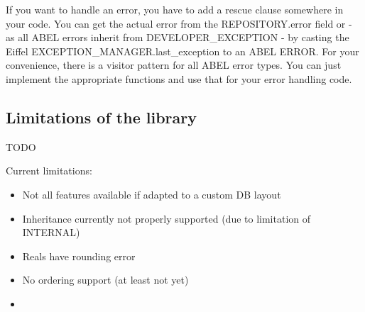 If you want to handle an error, you have to add a rescue clause somewhere in your code. 
You can get the actual error from the REPOSITORY.error field or - as all ABEL errors inherit from DEVELOPER\_EXCEPTION - by casting the Eiffel EXCEPTION\_MANAGER.last\_exception to an ABEL ERROR.
For your convenience, there is a visitor pattern for all ABEL error types. You can just implement the appropriate functions and use that for your error handling code.


\subsection{Limitations of the library}
TODO

Current limitations:
\begin{itemize}
\item Not all features available if adapted to a custom DB layout 
\item Inheritance currently not properly supported (due to limitation of INTERNAL)
\item Reals have rounding error
\item No ordering support (at least not yet)
\item
\end{itemize}

